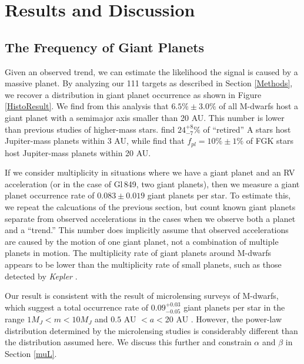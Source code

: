 \section{Results and Discussion}
\label{Results}
\subsection{The Frequency of Giant Planets}
\label{R1}

Given an observed trend, we can estimate the likelihood the signal is caused by a massive planet. By analyzing our 111 targets as described in Section \ref{Methods}, we recover a distribution in giant planet occurrence as shown in Figure \ref{HistoResult}. We find from this analysis that $6.5\% \pm 3.0\%$ of all M-dwarfs host a giant planet with a semimajor axis smaller than 20 AU. This number is lower than previous studies of higher-mass stars. \citet{Bowler10} find $24^{+8}_{-7}\%$ of ``retired'' A stars host Jupiter-mass planets within 3 AU, while \citet{Cumming08} find that $f_{pl} = 10\% \pm 1\%$ of FGK stars host Jupiter-mass planets within 20 AU. 

If we consider multiplicity in situations where we have a giant planet and an RV acceleration (or in the case of Gl\,849, two giant planets), then we measure a giant planet occurrence rate of $0.083 \pm 0.019$ giant planets per star. To estimate this, we repeat the calcuations of the previous section, but count known giant planets separate from observed accelerations in the cases when we observe both a planet and a ``trend.'' This number does implicitly assume that observed accelerations are caused by the motion of one giant planet, not a combination of multiple planets in motion. The multiplicity rate of giant planets around M-dwarfs appears to be lower than the multiplicity rate of small planets, such as those detected by \textit{Kepler} \citep{Youdin11}.

Our result is consistent with the result of microlensing surveys of M-dwarfs, which suggest a total occurrence rate of $0.09^{+0.03}_{-0.05}$ giant planets per star in the range $1 M_J < m < 10 M_J$ and $0.5$ AU $< a < $20 AU \citet{Cassan12}. However, the power-law distribution determined by the microlensing studies is considerably different than the \citet{Cumming08} distribution assumed here. We discuss this further and constrain $\alpha$ and $\beta$ in Section \ref{muL}.


